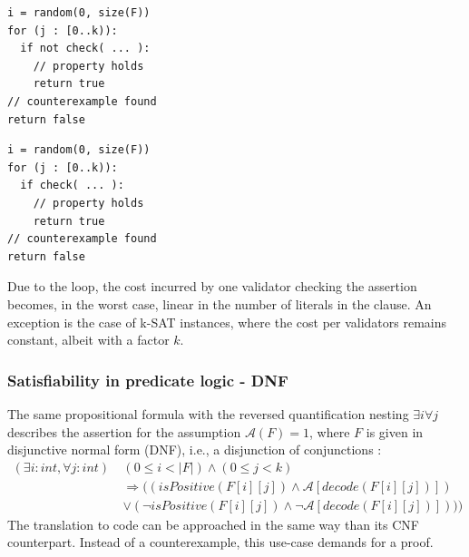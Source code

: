 \vspace{\baselineskip}
\noindent
\begin{minipage}{.45\textwidth}
\begin{lstlisting}[label=lst:cnf_code_neg, numbers=none]
i = random(0, size(F))
for (j : [0..k)):
  if not check( ... ):
    // property holds
    return true
// counterexample found
return false
\end{lstlisting}
\end{minipage}\hfill
\begin{minipage}{.45\textwidth}
\begin{lstlisting}[label=lst:cnf_code, numbers=none]
i = random(0, size(F))
for (j : [0..k)):
  if check( ... ):
    // property holds
    return true
// counterexample found
return false
\end{lstlisting}
\end{minipage}
\vspace{\baselineskip}

Due to the loop, the cost incurred by one validator checking the assertion becomes, in the worst case, linear in the number of literals in the clause. An exception is the case of k-SAT instances, where the cost per validators remains constant, albeit with a factor $k$. 

\subsubsection{Satisfiability in predicate logic - DNF}\label{sec:dnf}
The same propositional formula with the reversed quantification nesting $\exists i \forall j$ describes the assertion for the assumption $\mathcal{A}(F) = 1$, where $F$ is given in disjunctive normal form (DNF), i.e., a disjunction of conjunctions \cite{dnf_math_encycl}:
\begin{equation}\label{eq:dnf_sat}
\begin{aligned}
(\exists i : int, \forall j : int) \: &(0 \leq i < |F|) \wedge (0 \leq j < k) \\
&\Rightarrow ((isPositive(F[i][j]) \wedge \mathcal{A}[decode(F[i][j])]) \\
&\vee (\neg isPositive(F[i][j]) \wedge \neg \mathcal{A}[decode(F[i][j])])))
\end{aligned}
\end{equation}
The translation to code can be approached in the same way than its CNF counterpart. Instead of a counterexample, this use-case demands for a proof.

